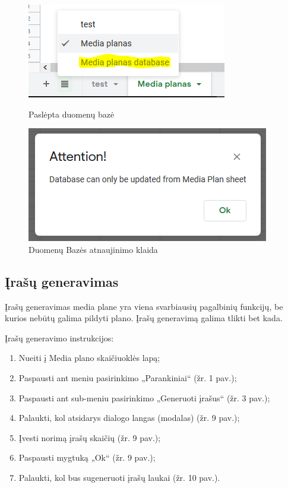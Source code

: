 \begin{figure}[h]
    \centering
    \begin{minipage}{0.45\textwidth}
        \centering
        \includegraphics[scale=0.8]{Images/Screenshots/media-plan-hidden-database.PNG} 
        \caption{Paslėpta duomenų bazė}
    \end{minipage}\hfill
    \begin{minipage}{0.45\textwidth}
        \centering
        \includegraphics[scale=0.6]{Images/Screenshots/media-plan-database-update-alert.PNG} 
        \caption{Duomenų Bazės atnaujinimo klaida}
    \end{minipage}
\end{figure}

\subsection{Įrašų generavimas}
Įrašų generavimas media plane yra viena svarbiausių pagalbinių funkcijų, be kurios nebūtų galima pildyti plano. Įrašų generavimą galima tlikti bet kada.

\bigskip
Įrašų generavimo instrukcijos: 
\begin{enumerate}
    \itemsep0em 
    \item Nueiti į Media plano skaičiuoklės lapą;
    \item Paspausti ant meniu pasirinkimo „Parankiniai“ (žr. 1 pav.);
    \item Paspausti ant sub-meniu pasirinkimo „Generuoti įrašus“ (žr. 3 pav.);
    \item Palaukti, kol atsidarys dialogo langas (modalas) (žr. 9 pav.);
    \item Įvesti norimą įrašų skaičių (žr. 9 pav.);
    \item Paspausti mygtuką „Ok“ (žr. 9 pav.);
    \item Palaukti, kol bus sugeneruoti įrašų laukai (žr. 10 pav.).
\end{enumerate}

